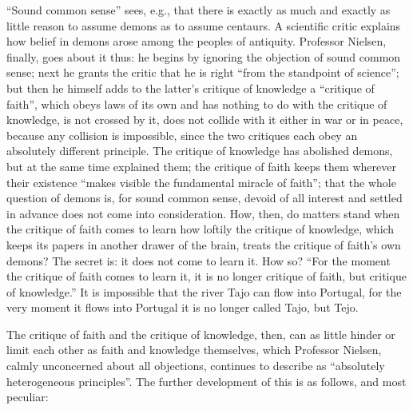 \documentclass[12pt,a4paper,openany]{book}
\newcommand{\opage}[1]{\marginnote{\footnotesize\textit{[#1]}}}
\begin{document}
``Sound common sense'' sees, e.g., that there is exactly as much and
exactly as little reason to assume demons as to assume centaurs. A
scientific critic explains how belief in demons arose among the peoples
of antiquity. Professor Nielsen, finally, goes about it thus: he
begins by ignoring the objection of sound common sense; next he grants
the critic that he is right ``from the standpoint of science''; but then
he himself adds to the latter's critique of knowledge a ``critique of
faith'', which obeys laws of its own and has nothing to do with the
critique of knowledge, is not crossed by it, does not collide with it
either in war or in peace, because any collision is impossible, since
the two critiques each obey an absolutely different principle. The
critique of knowledge has abolished demons, but at the same time
explained them; the critique of faith keeps them wherever their
existence ``makes visible the fundamental miracle of faith''; that the
whole question of demons is, for sound common sense, devoid of all
interest and settled in advance does not come into consideration. How,
then, do matters stand when the critique of faith comes to learn how
loftily the critique of knowledge, which keeps its papers in another
drawer of the brain, treats the critique of faith's own demons? The
secret is: it does not come to learn it. How so? ``For the moment the
critique of faith comes to learn it, it is no longer critique of
faith, but critique of knowledge.'' It is impossible that the river
Tajo can flow into Portugal, for the very moment it flows into
Portugal it is no longer called Tajo, but Tejo.

The critique of faith and the critique of knowledge, then, can as
little hinder or
\opage{88}limit each other as faith and knowledge themselves, which
Professor Nielsen, calmly unconcerned about all objections, continues
to describe as ``absolutely heterogeneous principles''. The further
development of this is as follows, and most peculiar:
\end{document}
